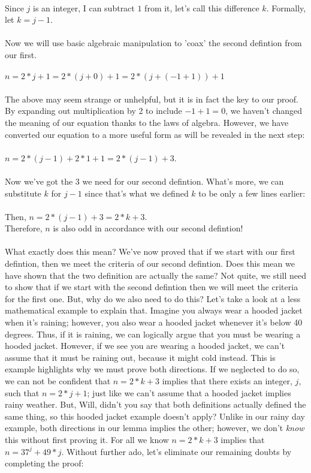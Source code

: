 \documentclass[a4paper,12pt]{article}
\begin{document}
\\
Since $j$ is an integer, I can subtract $1$ from it, let's call this difference $k$. Formally, let $k = j - 1$.\\
\\
Now we will use basic algebraic manipulation to 'coax' the second defintion from our first.\\
\\
$n = 2*j + 1 = 2*(j + 0) + 1 = 2*(j + (-1 + 1)) + 1$\\
\\
The above may seem strange or unhelpful, but it is in fact the key to our proof. By expanding out multiplication by 2 to include $-1 + 1 = 0$, we haven't changed the meaning of our equation thanks to the laws of algebra. However, we have converted our equation to a more useful form as will be revealed in the next step:\\
\\
$n = 2*(j - 1) + 2*1 + 1 = 2*(j - 1) + 3$.\\
\\
Now we've got the $3$ we need for our second defintion. What's more, we can substitute $k$ for $j - 1$ since that's what we defined $k$ to be only a few lines earlier:\\
\\
Then, $n = 2*(j - 1) + 3 = 2*k + 3$.\\
Therefore, $n$ is also odd in accordance with our second defintion!\\
\\
What exactly does this mean? We've now proved that if we start with our first defintion, then we meet the criteria of our second defintion. Does this mean we have shown that the two definition are actually the same? Not quite, we still need to show that if we start with the second defintion then we will meet the criteria for the first one. But, why do we also need to do this? Let's take a look at a less mathematical example to explain that. Imagine you always wear a hooded jacket when it's raining; however, you also wear a hooded jacket whenever it's below 40 degrees. Thus, if it is raining, we can logically argue that you must be wearing a hooded jacket. However, if we see you are wearing a hooded jacket, we can't assume that it must be raining out, because it might cold instead. This is example highlights why we must prove both directions. If we neglected to do so, we can not be confident that $n = 2*k + 3$ implies that there exists an integer, $j$, such that $n = 2*j + 1$; just like we can't assume that a hooded jacket implies rainy weather. But, Will, didn't you say that both definitions actually defined the same thing, so this hooded jacket example doesn't apply? Unlike in our rainy day example, both directions in our lemma implies the other; however, we don't \textit{know} this without first proving it. For all we know $n = 2*k + 3$ implies that $n = 37^j + 49*j$. Without further ado, let's eliminate our remaining doubts by completing the proof:\\
\end{document}

